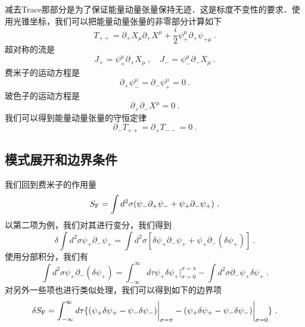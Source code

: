 减去Trace那部分是为了保证能量动量张量保持无迹．这是标度不变性的要求．使用光锥坐标，我们可以把能量动量张量的非零部分计算如下
\begin{equation}
T_{++} = \partial_+X_\mu\partial_+X^\mu + \frac{i}{2} \psi^\mu_+ \partial_+ \psi_{+\mu}~.
\end{equation}
超对称的流是
\begin{equation}
J_+ = \psi^\mu_+ \partial_+ X_\mu~, \quad J_- = \psi^\mu_- \partial_- X_\mu ~.
\end{equation}
费米子的运动方程是
\begin{equation}
\partial_+\psi^\mu_- = \partial_- \psi^\mu_+ = 0~.
\end{equation}
玻色子的运动方程是
\begin{equation}
\partial_+\partial_- X^\mu = 0~.
\end{equation}
我们可以得到能量动量张量的守恒定律
\begin{equation}
\partial_- T_{++} = \partial_+ T_{--} = 0~.
\end{equation}

\subsection{模式展开和边界条件}
我们回到费米子的作用量
\begin{equation}
S_{\rm F} = \int d^2\sigma (\psi_-\partial_+\psi_-+\psi_+\partial_-\psi_+)~.
\end{equation}
以第二项为例，我们对其进行变分，我们得到
\begin{equation}
\delta \int d^2\sigma\psi_+ \partial_- \psi_+ = \int d^2\sigma [\delta\psi_+\partial_-\psi_+ + \psi_+ \partial_- (\delta\psi_+)]~.
\end{equation}
使用分部积分，我们有
\begin{equation}
\int d^2\sigma \psi_+ \partial_- (\delta\psi_+) = \int_{-\infty}^{\infty} d \tau \psi_+ \delta\psi_+ \bigg|_{\sigma = 0}^{\sigma = \pi} - \int d^2\sigma \partial_-\psi_+\delta\psi_+~.
\end{equation}
对另外一些项也进行类似处理，我们可以得到如下的边界项
\begin{equation}
\delta S_{\rm F} = \int_{-\infty}^{\infty} d\tau \{ (\psi_+\delta \psi_+ - \psi_-\delta \psi_-) \bigg|_{\sigma = \pi} - (\psi_+\delta\psi_+ - \psi_-\delta\psi_-) \bigg|_{\sigma = 0} \}~.
\end{equation}


